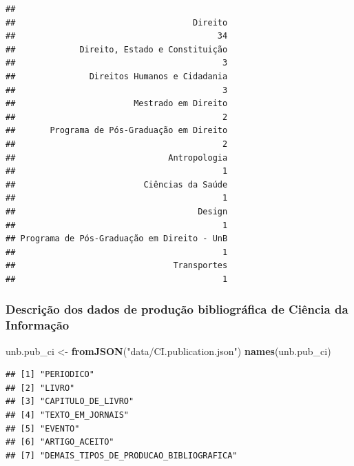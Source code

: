 \documentclass[]{article}
\newenvironment{Shaded}{\begin{snugshade}}{\end{snugshade}}
\newcommand{\KeywordTok}[1]{\textcolor[rgb]{0.13,0.29,0.53}{\textbf{#1}}}
\newcommand{\DataTypeTok}[1]{\textcolor[rgb]{0.13,0.29,0.53}{#1}}
\newcommand{\DecValTok}[1]{\textcolor[rgb]{0.00,0.00,0.81}{#1}}
\newcommand{\StringTok}[1]{\textcolor[rgb]{0.31,0.60,0.02}{#1}}
\newcommand{\OtherTok}[1]{\textcolor[rgb]{0.56,0.35,0.01}{#1}}
\newcommand{\OperatorTok}[1]{\textcolor[rgb]{0.81,0.36,0.00}{\textbf{#1}}}
\newcommand{\NormalTok}[1]{#1}
\begin{document}
\begin{Shaded}
\end{Shaded}

\begin{verbatim}
## 
##                                    Direito 
##                                         34 
##             Direito, Estado e Constituição 
##                                          3 
##               Direitos Humanos e Cidadania 
##                                          3 
##                        Mestrado em Direito 
##                                          2 
##       Programa de Pós-Graduação em Direito 
##                                          2 
##                               Antropologia 
##                                          1 
##                          Ciências da Saúde 
##                                          1 
##                                     Design 
##                                          1 
## Programa de Pós-Graduação em Direito - UnB 
##                                          1 
##                                Transportes 
##                                          1
\end{verbatim}

\subsubsection{Descrição dos dados de produção bibliográfica de Ciência
da
Informação}\label{descricao-dos-dados-de-producao-bibliografica-de-ciencia-da-informacao}

\begin{Shaded}
\begin{Highlighting}[]
\NormalTok{unb.pub_ci <-}\StringTok{ }\KeywordTok{fromJSON}\NormalTok{(}\StringTok{"data/CI.publication.json"}\NormalTok{)}
\KeywordTok{names}\NormalTok{(unb.pub_ci)}
\end{Highlighting}
\end{Shaded}

\begin{verbatim}
## [1] "PERIODICO"                             
## [2] "LIVRO"                                 
## [3] "CAPITULO_DE_LIVRO"                     
## [4] "TEXTO_EM_JORNAIS"                      
## [5] "EVENTO"                                
## [6] "ARTIGO_ACEITO"                         
## [7] "DEMAIS_TIPOS_DE_PRODUCAO_BIBLIOGRAFICA"
\end{verbatim}
\end{document}
